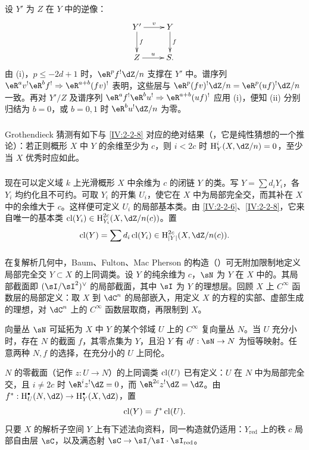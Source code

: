 设 $Y'$ 为 $Z$ 在 $Y$ 中的逆像：
\[\xymatrix{Y'\ar[r]^-v\ar[d]^-f&Y\ar[d]^-f\\Z\ar[r]^-u&S.}\]
由 (i)，$p\leqslant-2d+1$ 时，$\eR^pf^!\dZ/n$ 支撑在 $Y'$ 中。谱序列 $\eR^av^!\eR^bf^!\Rightarrow\eR^{a+b}(fv)^!$ 表明，这些层与 $\eR^p(fv)^!\dZ/n=\eR^p(uf)^!\dZ/n$ 一致。再对 $Y'/Z$ 及谱序列 $\eR^af^!\eR^bu^!\Rightarrow\eR^{a+b}(uf)^!$ 应用 (i)，便知 (ii) 分别归结为 $b=0$，或 $b=0,1$ 时 $\eR^bu^!\dZ/n$ 为零。

\subsubsection{}\label{IV:2-2-9}
Grothendieck 猜测有如下与 \ref{IV:2-2-8} 对应的绝对结果（，它是纯性猜想的一个推论）：若正则概形 $X$ 中 $Y$ 的余维至少为 $c$，则 $i<2c$ 时 $\h_Y^i(X,\dZ/n)=0$，至少当 $X$ 优秀时应如此。

\subsubsection{}\label{IV:2-2-10}
现在可以定义域 $k$ 上光滑概形 $X$ 中余维为 $c$ 的闭链 $Y$ 的类。写 $Y=\sum d_iY_i$，各 $Y_i$ 均约化且不可约。可取 $Y_i$ 的开集 $U_i$，使它在 $X$ 中为局部完全交，而其补在 $X$ 中的余维大于 $c$。这样便可定义 $U_i$ 的局部基本类。由 \ref{IV:2-2-6}、\ref{IV:2-2-8}，它来自唯一的基本类 $\cl(Y_i)\in\h_{Y_i}^{2c}(X,\dZ/n(c))$。置
\[
\cl(Y)=\sum d_i\cl(Y_i)\in\h_{|Y|}^{2c}(X,\dZ/n(c)).
\]

\subsubsection{}\label{IV:2-2-11}
在复解析几何中，Baum、Fulton、Mac Pherson 的构造（\cite[IV 4]{bfm75}）可无附加限制地定义局部完全交 $Y\subset X$ 的上同调类。设 $Y$ 的纯余维为 $c$，$\sN$ 为 $Y$ 在 $X$ 中的。其局部截面即 $(\sI/\sI^2)^\vee$ 的局部截面，其中 $\sI$ 为 $Y$ 的理想层。回顾 $X$ 上 $C^\infty$ 函数层的局部定义：取 $X$ 到 $\dC^n$ 的局部嵌入，用定义 $X$ 的方程的实部、虚部生成的理想，对 $\dC^n$ 上的 $C^\infty$ 函数层取商，再限制到 $X$。

向量丛 $\sN$ 可延拓为 $X$ 中 $Y$ 的某个邻域 $U$ 上的 $C^\infty$ 复向量丛 $N$。当 $U$ 充分小时，存在 $N$ 的截面 $f$，其零点集为 $Y$，且沿 $Y$ 有 $df:\sN\to N$ 为恒等映射。任意两种 $N,f$ 的选择，在充分小的 $U$ 上同伦。

$N$ 的零截面（记作 $z:U\to N$）的上同调类 $\operatorname{cl}(U)$ 已有定义：$U$ 在 $N$ 中为局部完全交，且 $i\ne2c$ 时 $\eR^iz^!\dZ=0$，而 $\eR^{2c}z^!\dZ=\dZ$。由
$f^*:\h_U^\bullet(N,\dZ)\to\h_Y^\bullet(X,\dZ)$，置
\[
\operatorname{cl}(Y)=f^*\operatorname{cl}(U).
\]
只要 $X$ 的解析子空间 $Y$ 上有下述法向资料，同一构造就仍适用：$Y_{\text{red}}$ 上的秩 $c$ 局部自由层 $\sC$，以及满态射 $\sC\to\sI/\sI\cdot\sI_{\text{red}}$。

